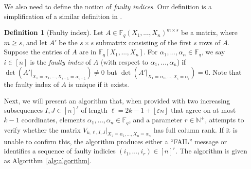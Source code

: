 \documentclass[11pt]{article}
\theoremstyle{plain}
\theoremstyle{definition}
\newtheorem{defn}[thm]{Definition}
\theoremstyle{remark}
\newcommand{\F}{\mathbb{F}}
\newcommand{\floor}[1]{\left\lfloor #1 \right\rfloor}
\begin{document}
We also need to define the notion of \emph{faulty indices}. Our definition is a simplification of a similar definition in \cite{GZ23}. 


\begin{defn}[Faulty index]\label{defn:faulty}
Let $A\in\F_q(X_1,\dots,X_n)^{m\times s}$ be a matrix, where $m\ge s$, and let $A'$ be the $s\times s$ submatrix consisting of the first $s$ rows of $A$. Suppose the entries of $A$ are in $\F_q[X_1,\dots,X_n]$.
For $\alpha_1,\dots,\alpha_n\in \F_q$, we say $i\in [n]$ is the \emph{faulty index} of $A$ (with respect to $\alpha_1,\dots,\alpha_n$) if   $\det(A'|_{X_1=\alpha_1,\dots,X_{i-1}=\alpha_{i-1}})\neq 0$ but $\det(A'|_{X_1=\alpha_1,\dots,X_{i}=\alpha_{i}})= 0$. Note that the faulty index of $A$ is unique if it exists. 
\end{defn}
Next, we will present an algorithm that, when provided with two increasing subsequences $I,J\in[n]^{\ell}$ of length $\ell=2k-1+\floor{\varepsilon n}$ that agree on at most $k-1$ coordinates, elements $\alpha_1,\dots,\alpha_n\in\F_q$, and a parameter $r\in\mathbb{N}^+$, attempts to verify whether the matrix $V_{k,\ell,I,J}|_{X_1=\alpha_1,\dots,X_n=\alpha_n}$ has full column rank. If it is unable to confirm this, the algorithm produces either a ``FAIL'' message or identifies a sequence of faulty indicies $(i_1,\dots,i_r)\in [n]^r$. 
The algorithm is given as  Algorithm~\ref{alg:algorithm}.
\end{document}
